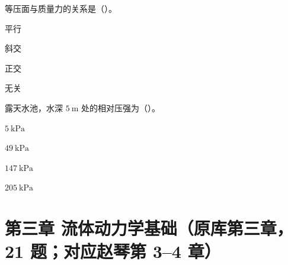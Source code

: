 \begin{ti}
\item[2-9] 等压面与质量力的关系是（\quad）。
\begin{choices}
\item 平行
\item 斜交
\item 正交
\item 无关
\end{choices}

\item[2-10] 露天水池，水深 $5\ \mathrm{m}$ 处的相对压强为（\quad）。
\begin{choices}
\item $5\ \mathrm{kPa}$
\item $49\ \mathrm{kPa}$
\item $147\ \mathrm{kPa}$
\item $205\ \mathrm{kPa}$
\end{choices}

\end{ti}

\section*{第三章 流体动力学基础（原库第三章，21 题；对应赵琴第 3--4 章）}

